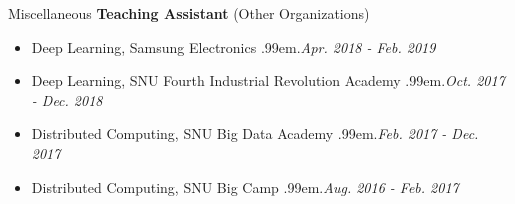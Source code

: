 \documentclass{resume} %
\makeatletter
\newcommand \Dotfill {\leavevmode \cleaders \hb@xt@ .99em{\hss .\hss }\hfill \kern \z@}
\makeatother
\begin{document}
\begin{rSection}{Miscellaneous}
\textbf{Teaching Assistant} (Other Organizations)
\begin{itemize}[noitemsep]
	\item Deep Learning, Samsung Electronics \smallskip \Dotfill \emph{Apr. 2018 - Feb. 2019}
	\item Deep Learning, SNU Fourth Industrial Revolution Academy \smallskip \Dotfill \emph{Oct. 2017 - Dec. 2018}
	\item Distributed Computing, SNU Big Data Academy \smallskip \Dotfill \emph{Feb. 2017 - Dec. 2017}
	\item Distributed Computing, SNU Big Camp \smallskip \Dotfill \emph{Aug. 2016 - Feb. 2017}
\end{itemize}

\end{rSection}


\begin{comment}
\begin{rSection}{Working Experience}

\textbf{Infosys Limited} (Bengaluru, India) \hfill \emph{Jun. 2015 - Jul. 2015} \\ 
Student Intern \\
Project: \emph{Prediction of CPU and memory usage in cloud services}

\textbf{SK Hynix} (Incheon, South Korea) \hfill \emph{Dec. 2014 - Jan. 2015} \\ 
Student Intern \\
Project: \emph{Documentation and improvement of SSD controller systems}

\textbf{KISTI} (Daejeon, South Korea) \hfill \emph{Jan. 2014 - Feb. 2014} \\ 
Student Intern \\
Project: \emph{Exploiting HTCaaS for traffic simulation}

\end{rSection}
\end{comment}

\end{document}
